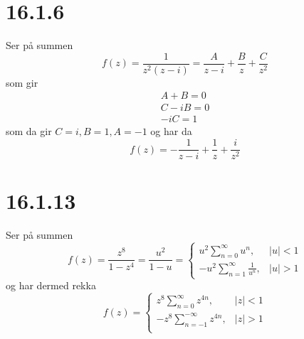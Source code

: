 \documentclass{report}
\begin{document}
\section*{16.1.6}
Ser på summen
\begin{equation}
  \label{eq:33}
  f(z) = \frac{1}{z^{2}(z-i)} = \frac{A}{z-i} + \frac{B}{z} + \frac{C}{z^{2}}
\end{equation}
som gir
\begin{equation}
  \label{eq:35}
  \begin{array}{l}
    A + B = 0 \\
    C - iB = 0 \\
    -iC = 1
  \end{array}
\end{equation}
som da gir $C = i, B = 1, A = -1$ og har da
\begin{equation}
  \label{eq:36}
  f(z) = -\frac{1}{z-i} + \frac{1}{z} + \frac{i}{z^{2}}
\end{equation}


\section*{16.1.13}
Ser på summen
\begin{equation}
  \label{eq:38}
  f(z) = \frac{z^{8}}{1-z^{4}} = \frac{u^{2}}{1-u} = \left\lbrace
    \begin{array}{ll}
      u^{2} \sum_{n=0}^{\infty} u^{n}, & |u| < 1 \\
      -u^{2} \sum_{n=1}^{\infty} \frac{1}{u^{n}}, & |u| > 1
    \end{array} \right.
\end{equation}
og har dermed rekka
\begin{equation}
  \label{eq:39}
  f(z) = \left\lbrace
    \begin{array}{ll}
      z^{8} \sum_{n=0}^{\infty} z^{4n} , & |z| < 1 \\
      -z^{8} \sum_{n=-1}^{-\infty} z^{4n} , & |z| > 1 \\
    \end{array}
    \right.
\end{equation}
\end{document}
